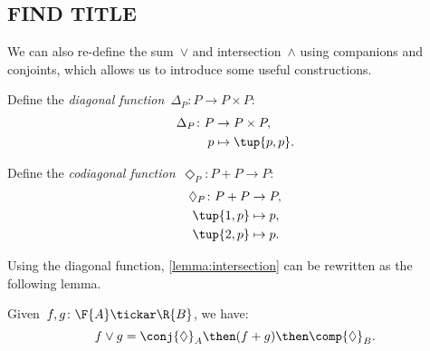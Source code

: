 \subsection{FIND TITLE}

We can also re-define the sum~$\vee$ and intersection~$\wedge$ using companions and conjoints, which allows us to introduce some useful constructions.

\begin{definition}
Define the \emph{diagonal function}~$\Delta_P\colon P \to P \times P$:
\begin{equation}
\begin{aligned}
    \Delta_P \colon P & \to P \times P, \\
             p & \mapsto \tup{p, p}.
\end{aligned}
\end{equation}
\end{definition}

\begin{definition}
Define the \emph{codiagonal function}~$\Diamond_P\colon P+P \to P $:
\begin{equation}
\begin{aligned}
    \Diamond_P \colon P + P & \to P,  \\
            \tup{1,p} & \mapsto p, \\
            \tup{2,p} & \mapsto p.
\end{aligned}
\end{equation}
\end{definition}

\noindent Using the diagonal function, \cref{lemma:intersection} can be rewritten as the following lemma.

\begin{lemma}
    Given~$f, g\colon \F{A} \tickar \R{B}$, we have:
    \begin{equation}
        f \vee g =  \conj{\Diamond}_A \then (f + g)\then \comp{\Diamond}_B.
    \end{equation}
\end{lemma}

